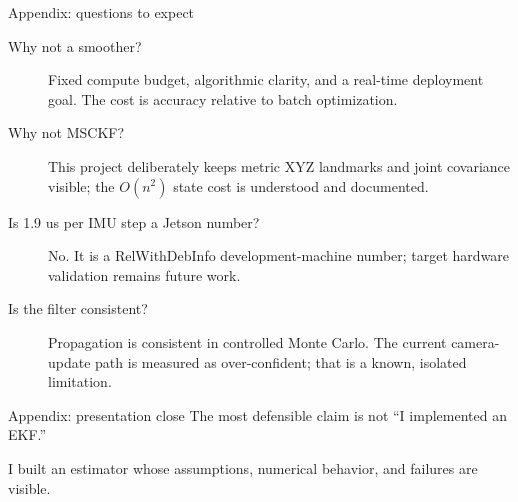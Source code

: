 \documentclass[10pt,aspectratio=169]{beamer}
\begin{document}
\begin{frame}{Appendix: questions to expect}
  \small
  \begin{description}
    \item[Why not a smoother?] Fixed compute budget, algorithmic clarity, and a real-time deployment goal. The cost is accuracy relative to batch optimization.
    \item[Why not MSCKF?] This project deliberately keeps metric XYZ landmarks and joint covariance visible; the $O(n^2)$ state cost is understood and documented.
    \item[Is 1.9 us per IMU step a Jetson number?] No. It is a RelWithDebInfo development-machine number; target hardware validation remains future work.
    \item[Is the filter consistent?] Propagation is consistent in controlled Monte Carlo. The current camera-update path is measured as over-confident; that is a known, isolated limitation.
  \end{description}
\end{frame}

\begin{frame}{Appendix: presentation close}
  \centering
  \Large The most defensible claim is not ``I implemented an EKF.''
  \vspace{1em}

  \color{navy}\Huge I built an estimator whose assumptions, numerical behavior, and failures are visible.
\end{frame}
\end{document}
